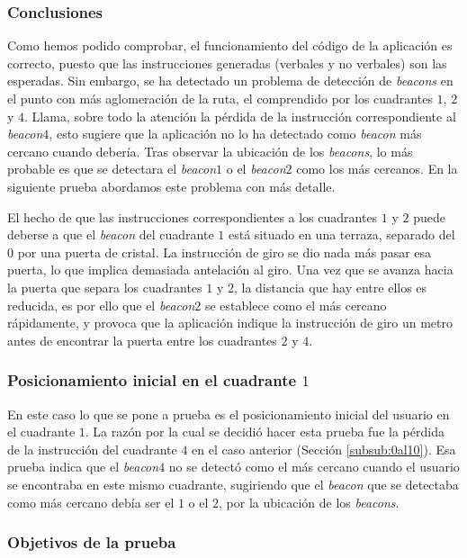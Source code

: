 \subsubsection*{Conclusiones}

Como hemos podido comprobar, el funcionamiento del código de la aplicación es correcto, puesto que las instrucciones generadas (verbales y no verbales) son las esperadas. Sin embargo, se ha detectado un problema de detección de \textit{beacons} en el punto con más aglomeración de la ruta, el comprendido por los cuadrantes $1$, $2$ y $4$. Llama, sobre todo la atención la pérdida de la instrucción correspondiente al \textit{beacon$4$}, esto sugiere que la aplicación no lo ha detectado como \textit{beacon} más cercano cuando debería. Tras observar la ubicación de los \textit{beacons}, lo más probable es que se detectara el \textit{beacon$1$} o el \textit{beacon$2$} como los más cercanos. En la siguiente prueba abordamos este problema con más detalle. 

El hecho de que las instrucciones correspondientes a los cuadrantes $1$ y $2$ puede deberse a que el \textit{beacon} del cuadrante $1$ está situado en una terraza, separado del $0$ por una puerta de cristal. La instrucción de giro se dio nada más pasar esa puerta, lo que implica demasiada antelación al giro. Una vez que se avanza hacia la puerta que separa los cuadrantes $1$ y $2$, la distancia que hay entre ellos es reducida, es por ello que el \textit{beacon$2$} se establece como el más cercano rápidamente, y provoca que la aplicación indique la instrucción de giro un metro antes de encontrar la puerta entre los cuadrantes $2$ y $4$.


\subsubsection{Posicionamiento inicial en el cuadrante $1$}
\label{subsub:pos1}

En este caso lo que se pone a prueba es el posicionamiento inicial del usuario en el cuadrante $1$. La razón por la cual se decidió hacer esta prueba fue la pérdida de la instrucción del cuadrante $4$ en el caso anterior (Sección \ref{subsub:0al10}). Esa prueba indica que el \textit{beacon$4$} no se detectó como el más cercano cuando el usuario se encontraba en este mismo cuadrante, sugiriendo que el \textit{beacon} que se detectaba como más cercano debía ser el $1$ o el $2$, por la ubicación de los \textit{beacons}. 


\subsubsection*{Objetivos de la prueba}

